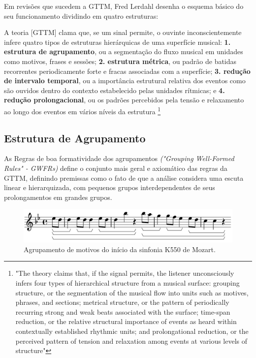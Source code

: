 \documentclass[
	12pt,				%
	openright,			%
	twoside,			%
	a4paper,			%
	english,			%
	french,				%
	spanish,			%
	brazil				%
	]{abntex2}
\begin{document}
Em revisões que sucedem a GTTM, Fred Lerdahl desenha o esquema básico do seu funcionamento dividindo em quatro estruturas:

\begin{citacao}
A teoria [GTTM] clama que, se um sinal permite, o ouvinte inconscientemente infere quatro tipos de estruturas hierárquicas de uma superfície musical:\linebreak 
\textbf{1. estrutura de agrupamento}, ou a segmentação do fluxo musical em unidades como motivos, frases e sessões; 
\textbf{2. estrutura métrica}, ou padrão de batidas recorrentes periodicamente forte e fracas associadas com a superfície; 
\textbf{3. redução de intervalo temporal}, ou a importância estrutural relativa dos eventos como são ouvidos dentro do contexto estabelecido pelas unidades rítmicas; e
\textbf{4. redução prolongacional}, ou os padrões percebidos pela tensão e relaxamento ao longo dos eventos em vários níveis da estrutura \cite{lerdahl1992cognitive}
\footnote{
"The theory claims that, if the signal permits, the listener unconsciously infers four types of hierarchical structure from a musical surface: grouping structure, or the segmentation of the musical flow into units such as motives, phrases, and sections; metrical structure, or the pattern of periodically recurring strong and weak beats associated with the surface; time-span reduction, or the relative structural importance of events as heard within contextually established rhythmic units; and prolongational reduction, or the perceived pattern of tension and relaxation among events at various levels of structure"\cite{lerdahl1992cognitive}

}
\end{citacao}

\pagebreak
\subsection{Estrutura de Agrupamento}

As Regras de boa formatividade dos agrupamentos \textit{("Grouping Well-Formed Rules" - GWFRs) }define o conjunto mais geral e axiomático das regras da GTTM, definindo premissas como o fato de que a análise considera uma escuta linear e hierarquizada, com pequenos grupos interdependentes de seus prolongamentos em grandes grupos.

\begin{figure}[htb]
	\caption{\label{fig_grafico}Agrupamento de motivos do início da sinfonia K550 de Mozart.}
	\begin{center}
	    \includegraphics[scale=0.45]{gttm/lilypondGROUPmozartGTTM.png}
	\end{center}
\end{figure}
\end{document}
